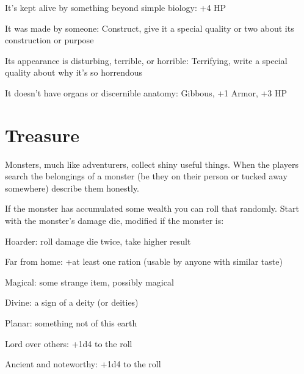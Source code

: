          
\item It's kept alive by something beyond simple biology: +4 HP

         
\item It was made by someone: Construct, give it a special quality or two about its construction or purpose

         
\item Its appearance is disturbing, terrible, or horrible: Terrifying, write a special quality about why it's so horrendous

         
\item It doesn't have organs or discernible anatomy: Gibbous, +1 Armor, +3 HP

       
\stopitemize
       
\section{Treasure}   
       

Monsters, much like adventurers, collect shiny useful things. When the players search the belongings of a monster (be they on their person or tucked away somewhere) describe them honestly.

       

If the monster has accumulated some wealth you can roll that randomly. Start with the monster's damage die, modified if the monster is:

       
\startitemize[1,packed]
         
\item Hoarder: roll damage die twice, take higher result

         
\item Far from home: +at least one ration (usable by anyone with similar taste)

         
\item Magical: some strange item, possibly magical

         
\item Divine: a sign of a deity (or deities)

         
\item Planar: something not of this earth

         
\item Lord over others: +1d4 to the roll

         
\item Ancient and noteworthy: +1d4 to the roll

       
\stopitemize
       

